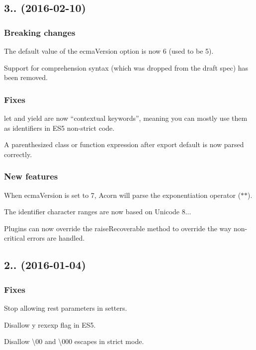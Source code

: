 \subsection*{3.. (2016-\/02-\/10)}

\subsubsection*{Breaking changes}

The default value of the {\ttfamily ecma\+Version} option is now 6 (used to be 5).

Support for comprehension syntax (which was dropped from the draft spec) has been removed.

\subsubsection*{Fixes}

{\ttfamily let} and {\ttfamily yield} are now “contextual keywords”, meaning you can mostly use them as identifiers in E\+S5 non-\/strict code.

A parenthesized class or function expression after {\ttfamily export default} is now parsed correctly.

\subsubsection*{New features}

When {\ttfamily ecma\+Version} is set to 7, Acorn will parse the exponentiation operator ({\ttfamily $\ast$$\ast$}).

The identifier character ranges are now based on Unicode 8...

Plugins can now override the {\ttfamily raise\+Recoverable} method to override the way non-\/critical errors are handled.

\subsection*{2.. (2016-\/01-\/04)}

\subsubsection*{Fixes}

Stop allowing rest parameters in setters.

Disallow {\ttfamily y} rexexp flag in E\+S5.

Disallow {\ttfamily \textbackslash{}00} and {\ttfamily \textbackslash{}000} escapes in strict mode.

